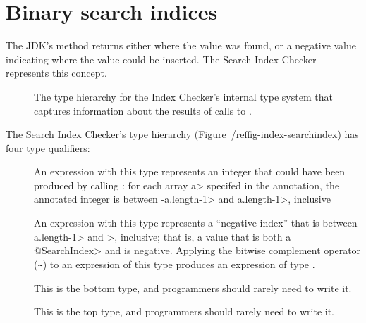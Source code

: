 \section{Binary search indices\label{index-searchindex}}

The JDK's
method returns either where the value was found, or a negative value
indicating where the value could be inserted.  The Search Index Checker
represents this concept.

\begin{figure}
\begin{center}
  \hfill
  \hfill
\end{center}
  \caption{The type hierarchy for the Index Checker's internal type system
  that captures information about the results of calls to
  .}
  \label{fig-index-searchindex}
\end{figure}

The Search Index Checker's type hierarchy (Figure~/ref{fig-index-searchindex}) has four type qualifiers:
\begin{description}
\item[]
  An expression with this type represents an integer that could have been produced by
  calling
  :
  for each array \<a> specifed in the annotation, the annotated integer is
  between \<-a.length-1> and \<a.length-1>, inclusive
\item[]
  An expression with this type represents a ``negative index'' that is
  between \<a.length-1> and >, inclusive; that is, a value that is both
  a \<@SearchIndex> and is negative.  Applying the bitwise complement
  operator (\verb|~|) to an expression of this type produces an expression of type
  .
\item[]
  This is the bottom type, and programmers should rarely need to write it.
\item[]
  This is the top type, and programmers should rarely need to write it.
\end{description}

